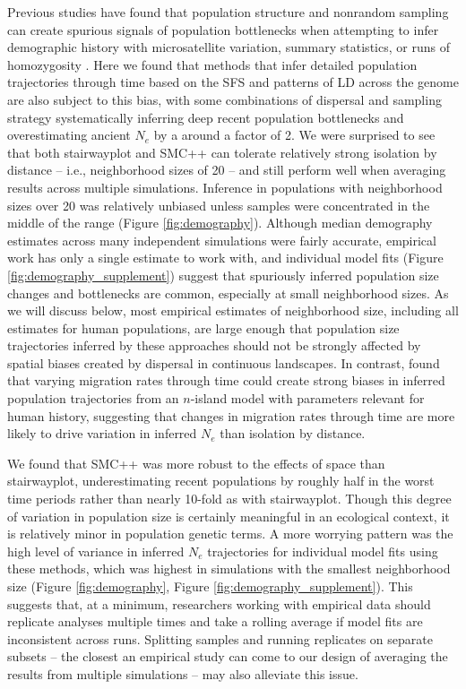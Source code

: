 \documentclass[10pt,twoside,lineno,hidelinks]{preprint}
\begin{document}
Previous studies have found that population structure and nonrandom sampling can create spurious signals of population bottlenecks when attempting to infer demographic history with microsatellite variation, summary statistics, or runs of homozygosity \citep{Chikhi2010,Stadler2009,Ptak2002,Mazet2015}. Here we found that methods that infer detailed population trajectories through time based on the SFS and patterns of LD across the genome are also subject to this bias, with some combinations of dispersal and sampling strategy systematically inferring deep recent population bottlenecks and overestimating ancient $N_{e}$ by a around a factor of 2. We were surprised to see that both stairwayplot and SMC++ can tolerate relatively strong isolation by distance -- i.e., neighborhood sizes of 20 -- and still perform well when averaging results across multiple simulations. Inference in populations with neighborhood sizes over 20 was relatively unbiased unless samples were concentrated in the middle of the range (Figure \ref{fig:demography}). 
Although median demography estimates across many independent simulations were fairly accurate,
empirical work has only a single estimate to work with,
and individual model fits (Figure \ref{fig:demography_supplement})
suggest that spuriously inferred population size changes and bottlenecks are common, especially at small neighborhood sizes.
As we will discuss below, most empirical estimates of neighborhood size, including all estimates for human populations, are large enough that population size trajectories inferred by these approaches should not be strongly affected by spatial biases created by dispersal in continuous landscapes. In contrast, \citet{Mazet2015} found that varying migration rates through time could create strong biases in inferred population trajectories from an $n$-island model with parameters relevant for human history, suggesting that changes in migration rates through time are more likely to drive variation in inferred $N_{e}$ than isolation by distance. 

We found that SMC++ was more robust to the effects of space than stairwayplot, underestimating recent populations by roughly half in the worst time periods rather than nearly 10-fold as with stairwayplot. Though this degree of variation in population size is certainly meaningful in an ecological context, it is relatively minor in population genetic terms. A more worrying pattern was the high level of variance in inferred $N_{e}$ trajectories for individual model fits using these methods, which was highest in simulations with the smallest neighborhood size (Figure \ref{fig:demography}, Figure \ref{fig:demography_supplement}). This suggests that, at a minimum, researchers working with empirical data should replicate analyses multiple times and take a rolling average if model fits are inconsistent across runs. Splitting samples and running replicates on separate subsets -- the closest an empirical study can come to our design of averaging the results from multiple simulations -- may also alleviate this issue. 
\end{document}

